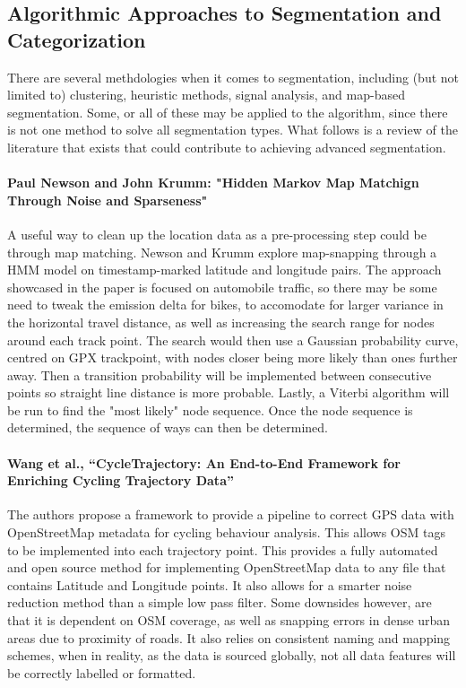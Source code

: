 \documentclass[12pt,a4paper]{article}
\begin{document}
\subsection{Algorithmic Approaches to Segmentation and Categorization}
There are several methdologies when it comes to segmentation, including (but not limited to) clustering, heuristic methods, signal analysis, and map-based segmentation. Some, or all of these may be
applied to the algorithm, since there is not one method to solve all segmentation types. What follows is a review of the literature that exists that could contribute to
achieving advanced segmentation.


\paragraph{Paul Newson and John Krumm: "Hidden Markov Map Matchign Through Noise and Sparseness"}
A useful way to clean up the location data as a pre-processing step could be through map matching. Newson and Krumm explore map-snapping through a HMM model on timestamp-marked latitude and longitude pairs.
The approach showcased in the paper is focused on automobile traffic, so there may be some need to tweak the emission delta for bikes, to accomodate for larger variance in the horizontal travel distance, as well as increasing
the search range for nodes around each track point. The search would then use a Gaussian probability curve, centred on GPX trackpoint, with nodes closer being more likely than ones further away. Then a transition probability will be implemented between consecutive points
so straight line distance is more probable. Lastly, a Viterbi algorithm will be run to find the "most likely" node sequence.
Once the node sequence is determined, the sequence of ways can then be determined.

\paragraph{Wang et al., “CycleTrajectory: An End-to-End Framework for Enriching Cycling Trajectory Data”}
The authors propose a framework to provide a pipeline to correct GPS data with OpenStreetMap metadata for cycling behaviour analysis. This allows
OSM tags to be implemented into each trajectory point. This provides a fully automated and open source method for implementing OpenStreetMap data to any file that contains Latitude and Longitude points.
It also allows for a smarter noise reduction method than a simple low pass filter. Some downsides however, are that it is dependent on OSM coverage, as well as snapping errors in dense urban areas due to proximity of roads. It also relies on consistent naming and mapping schemes, when
in reality, as the data is sourced globally, not all data features will be correctly labelled or formatted.
\end{document}
